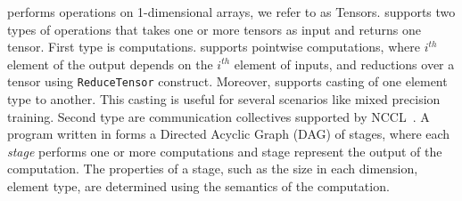 \iffalse 

\subsection{Equivalent Programs using Transformations}
\sm{this subsection provides nothing, I say we remove it.}
The way to express the same algorithm in \tool DSL is not unique.
For example, as shown in Figure~\ref{fig:reducescatter}, existing works~\cite{zero,gshard} distributes the computation by first doing \reducescatter to divide the summed values among all rank, then perform computation on the divided tensor, and finally performs \allgather to share the output of computation.
Next section describes several output-invariant transformation between different concrete programs.
\fi


\iffalse
\tool performs operations on 1-dimensional arrays, we refer to as Tensors.
\tool supports two types of operations that takes one or more tensors as input and returns one tensor.
First type is computations. 
\tool supports pointwise computations, where $i^{th}$ element of the output depends on the $i^{th}$ element of inputs, and reductions over a tensor using \texttt{ReduceTensor} construct.
Moreover, \tool supports casting of one element type to another.
This casting is useful for several scenarios like mixed precision training.
Second type are communication collectives supported by NCCL~\cite{nccl}.
A program written in \tool forms a Directed Acyclic Graph (DAG) of stages, where each \emph{stage} performs one or more computations and stage represent the output of the computation.
The properties of a stage, such as the size in each dimension, element type, are determined using the semantics of the computation.

